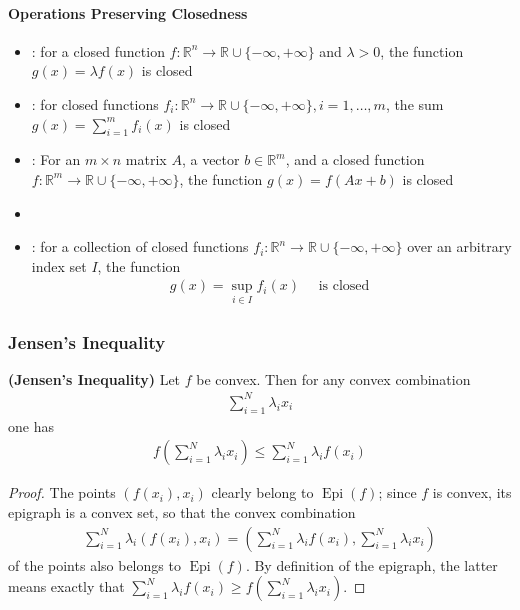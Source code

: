 \documentclass{article}
\newcommand{\bfs}[1]{\textbf{({#1}) }}
\newcommand{\Epi}{\operatorname{Epi} }
\begin{document}
\paragraph{Operations Preserving Closedness}
\begin{itemize}
    \item {}: for a closed function $f: \mathbb{R}^{n} \rightarrow \mathbb{R} \cup\{-\infty,+\infty\}$ and $\lambda>0$, the function $g(x)=\lambda f(x)$ is closed
    \item {}: for closed functions $f_{i}: \mathbb{R}^{n} \rightarrow \mathbb{R} \cup\{-\infty,+\infty\}, i=1, \ldots, m$, the sum $g(x)=\sum_{i=1}^{m} f_{i}(x)$ is closed
    \item {}: For an $m \times n$ matrix $A$, a vector $b \in \mathbb{R}^{m}$, and a closed function $f: \mathbb{R}^{m} \rightarrow \mathbb{R} \cup\{-\infty,+\infty\}$, the function $g(x)=f(A x+b)$ is closed
\item {}
\item {}: for a collection of closed functions $f_{i}: \mathbb{R}^{n} \rightarrow \mathbb{R} \cup\{-\infty,+\infty\}$ over an arbitrary index set $I$, the function
\begin{align*}
g(x)=\sup _{i \in I} f_{i}(x) \quad \text { is closed }
\end{align*}
\end{itemize}

\subsubsection{Jensen's Inequality}
\begin{thma}{\bfs{Jensen's Inequality}}
Let $f$ be convex. Then for any convex combination
\begin{align*}
\sum_{i=1}^{N} \lambda_{i} x_{i}
\end{align*}
one has
\begin{align*}
f\left(\sum_{i=1}^{N} \lambda_{i} x_{i}\right) \leq \sum_{i=1}^{N} \lambda_{i} f\left(x_{i}\right)
\end{align*}
\end{thma} 
\begin{proof}\color{ForestGreen}
 The points $\left(f\left(x_{i}\right), x_{i}\right)$ clearly belong to $\Epi (f)$; since $f$ is convex, its epigraph is a convex set, so that the convex combination
\begin{align*}
\sum_{i=1}^{N} \lambda_{i}\left(f\left(x_{i}\right), x_{i}\right)=\left(\sum_{i=1}^{N} \lambda_{i} f\left(x_{i}\right), \sum_{i=1}^{N} \lambda_{i} x_{i}\right)
\end{align*}
of the points also belongs to $\Epi (f)$. By definition of the epigraph, the latter means exactly that $\sum_{i=1}^{N} \lambda_{i} f\left(x_{i}\right) \geq f\left(\sum_{i=1}^{N} \lambda_{i} x_{i}\right)$.
\end{proof} 
\end{document}
